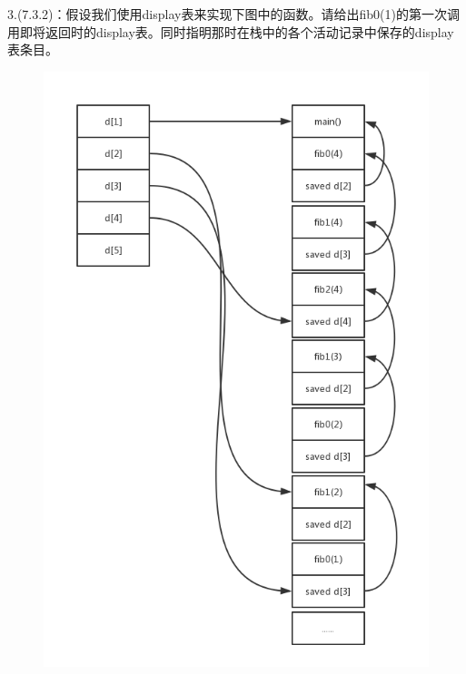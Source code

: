 \documentclass[a4paper, 16pt]{article}
\begin{document}
3.(7.3.2)：假设我们使用display表来实现下图中的函数。请给出fib0(1)的第一次调用即将返回时的display表。同时指明那时在栈中的各个活动记录中保存的display表条目。
\begin{figure}[H]
\centering
\includegraphics[scale = 0.6]{chapter7_3}
\label{f1}
\end{figure}
\end{document}
